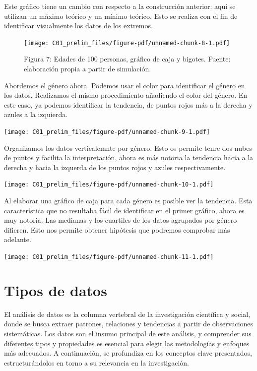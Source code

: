 \documentclass[
  letterpaper,
  DIV=11,
  numbers=noendperiod]{scrreprt}
\begin{document}
Este gráfico tiene un cambio con respecto a la construcción anterior:
aquí se utilizan un máximo teórico y un mínimo teórico. Esto se realiza
con el fin de identificar visualmente los datos de los extremos.

\begin{figure}[H]

{\centering \texttt{[image: C01\_prelim\_files/figure-pdf/unnamed-chunk-8-1.pdf]}

}

\caption{Figura 7: Edades de 100 personas, gráfico de caja y bigotes.
Fuente: elaboración propia a partir de simulación.}

\end{figure}%

Abordemos el género ahora. Podemos usar el color para identificar el
género en los datos. Realizamos el mismo procedimiento añadiendo el
color del género. En este caso, ya podemos identificar la tendencia, de
puntos rojos más a la derecha y azules a la izquierda.

\texttt{[image: C01\_prelim\_files/figure-pdf/unnamed-chunk-9-1.pdf]}

Organizamos los datos verticalemnte por género. Esto os permite tenre
dos nubes de puntos y facilita la interpretación, ahora es más notoria
la tendencia hacia a la derecha y hacia la izquerda de los puntos rojos
y azules respectivamente.

\texttt{[image: C01\_prelim\_files/figure-pdf/unnamed-chunk-10-1.pdf]}

Al elaborar una gráfico de caja para cada género es posible ver la
tendencia. Esta característica que no resultaba fácil de identificar en
el primer gráfico, ahora es muy notoria. Las medianas y los cuartiles de
los datos agrupados por género difieren. Esto nos permite obtener
hipótesis que podremos comprobar más adelante.

\texttt{[image: C01\_prelim\_files/figure-pdf/unnamed-chunk-11-1.pdf]}

\section{Tipos de datos}\label{tipos-de-datos}

El análisis de datos es la columna vertebral de la investigación
científica y social, donde se busca extraer patrones, relaciones y
tendencias a partir de observaciones sistemáticas. Los datos son el
insumo principal de este análisis, y comprender sus diferentes tipos y
propiedades es esencial para elegir las metodologías y enfoques más
adecuados. A continuación, se profundiza en los conceptos clave
presentados, estructurándolos en torno a su relevancia en la
investigación.
\end{document}
